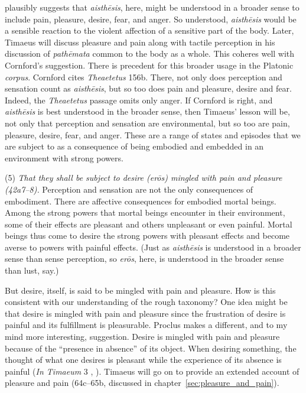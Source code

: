 \citet[143 n2]{Cornford:1935fk} plausibly suggests that \emph{aisthēsis}, here, might be understood in a broader sense to include pain, pleasure, desire, fear, and anger. So understood, \emph{aisthēsis} would be a sensible reaction to the violent affection of a sensitive part of the body. Later, Timaeus will discuss pleasure and pain along with tactile perception in his discussion of \emph{pathēmata} common to the body as a whole. This coheres well with Cornford's suggestion. There is precedent for this broader usage in the Platonic \emph{corpus}. Cornford cites \emph{Theaetetus} 156b. There, not only does perception and sensation count as \emph{aisthēsis}, but so too does pain and pleasure, desire and fear. Indeed, the \emph{Theaetetus} passage omits only anger. If Cornford is right, and \emph{aisthēsis} is best understood in the broader sense, then Timaeus' lesson will be, not only that perception and sensation are environmental, but so too are pain, pleasure, desire, fear, and anger. These are a range of states and episodes that we are subject to as a consequence of being embodied and embedded in an environment with strong powers.

(5) \emph{That they shall be subject to desire (\emph{erōs}) mingled with pain and pleasure (42a7--8).} Perception and sensation are not the only consequences of embodiment. There are affective consequences for embodied mortal beings.  Among the strong powers that mortal beings encounter in their environment, some of their effects are pleasant and others unpleasant or even painful. Mortal beings thus come to desire the strong powers with pleasant effects and become averse to powers with painful effects. (Just as \emph{aisthēsis} is understood in a broader sense than sense perception, so \emph{erōs}, here, is understood in the broader sense than lust, say.) 

But desire, itself, is said to be mingled with pain and pleasure. How is this consistent with our understanding of the rough taxonomy? One idea might be that desire is mingled with pain and pleasure since the frustration of desire is painful and its fulfillment is pleasurable. Proclus makes a different, and to my mind more interesting, suggestion. Desire is mingled with pain and pleasure because of the ``presence in absence'' of its object. When desiring something, the thought of what one desires is pleasant while the experience of its absence is painful (\emph{In Timaeum} 3  , \citealt{Diehl:1903re}). Timaeus will go on to provide an extended account of pleasure and pain (64c--65b, discussed in chapter~\ref{sec:pleasure_and_pain}).

